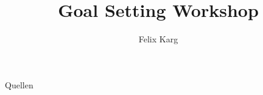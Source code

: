 \usepackage[ngerman, english]{babel}


\title{Goal Setting Workshop}
\author{Felix Karg}


\graphicspath{ {./img/} {../template/} {../template_tex/} } %

\newif\iftwocols
\twocolsfalse





\newif\ifonline
\onlinefalse



% 
% 
% 
% 






\begin{frame}{Quellen}
% 


\end{frame}





